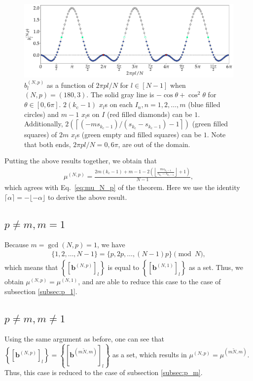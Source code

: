\begin{figure}[thbp]
    \centering
    \includegraphics[width=\textwidth]{figs/N180p3.pdf}
    \caption{
        $b^{(N,p)}_{l}$ as a function of $2\pi p l/N$ for $l\in[N-1]$ when $(N,p)=(180,3)$. The solid gray line is $-\cos\theta+\cos^{2}\theta$ for $\theta\in[0,6\pi]$. $2(k_{\mathrm{c}}-1)$ $x_l$s on each $I_n, n=1,2,\dots ,m$ (blue filled circles) and $m-1$ $x_l$s on $I$ (red filled diamonds) can be $1$. Additionally, $2\left(\left\lceil\left(-ms_{k_{\mathrm{c}}-1}\right)/(s_{k_{\mathrm{c}}}-s_{k_{\mathrm{c}}-1})-1\right\rceil\right)$ (green filled squares) of $2m$ $x_l$s (green empty and filled squares) can be $1$. Note that both ends, $2\pi p l/N=0, 6\pi$, are out of the domain.
    }
    \label{fig:N180p3}
\end{figure}

Putting the above results together, we obtain that
\begin{align}
    \mu^{(N,p)}=\frac{2m(k_{\mathrm{c}}-1)+m-1-2\left(\left\lfloor \frac{ms_{k_{\mathrm{c}}-1}}{s_{k_{\mathrm{c}}}-s_{k_{\mathrm{c}}-1}}\right\rfloor+1\right)}{N-1},
\end{align}
which agrees with Eq.~\eqref{eq:mu_N_p} of the theorem. Here we use the identity $\lceil\alpha\rceil=-\lfloor-\alpha\rfloor$ to derive the above result.

\subsection{$p\ne m,m=1$}
\label{subsec:m_1}
Because $m=\gcd(N, p)=1$, we have
\begin{align}
    \{1,2,\dots,N-1\}=\{p,2p,\dots,(N-1)p\} \pmod{N},
\end{align}
which means that $\left\{\left[\bm{b}^{(N,p)}\right]_l\right\}$ is equal to $\left\{\left[\bm{b}^{(N,1)}\right]_l\right\}$ as a set. Thus, we obtain $\mu^{(N,p)}=\mu^{(N,1)}$, and are able to reduce this case to the case of subsection \ref{subsec:p_1}.

\subsection{$p\ne m,m\ne1$}
\label{subsec:m_geq_1}
Using the same argument as before, one can see that $\left\{\left[\bm{b}^{(N,p)}\right]_l\right\}=\left\{\left[\bm{b}^{(m\widetilde{N}, m)}\right]_l\right\}$ as a set, which results in $\mu^{(N,p)}=\mu^{(m\widetilde{N},m)}$. Thus, this case is reduced to the case of subsection \ref{subsec:p_m}.

